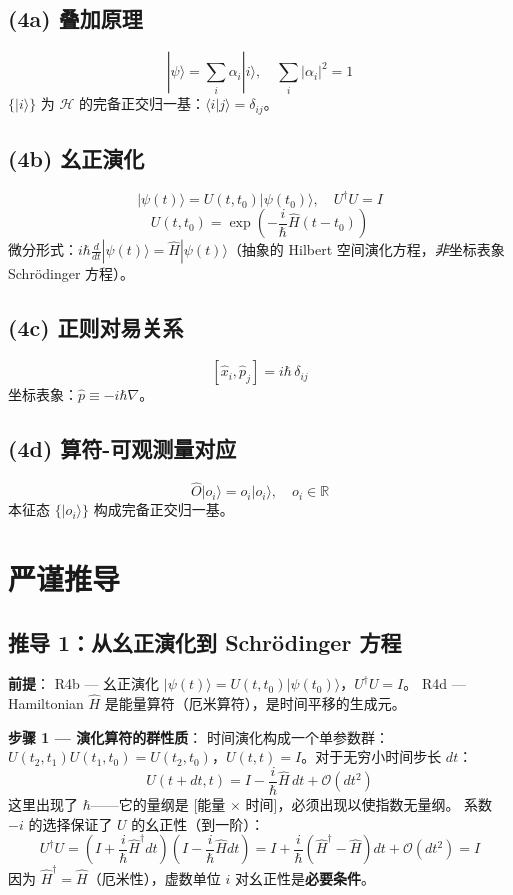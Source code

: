 \subsection{(4a) 叠加原理}
\[
|\psi\rangle = \sum_{i} \alpha_i |i\rangle, \quad \sum_i |\alpha_i|^2 = 1
\]
$\{|i\rangle\}$ 为 $\mathcal{H}$ 的完备正交归一基：$\langle i|j\rangle = \delta_{ij}$。

\subsection{(4b) 幺正演化}
\[
|\psi(t)\rangle = U(t, t_0) |\psi(t_0)\rangle, \quad U^\dagger U = I
\]
\[
U(t, t_0) = \exp\!\left(-\frac{i}{\hbar} \hat{H} (t - t_0)\right)
\]
微分形式：$i\hbar \frac{d}{dt}|\psi(t)\rangle = \hat{H} |\psi(t)\rangle$（抽象的 Hilbert 空间演化方程，\textit{非}坐标表象 Schrödinger 方程）。

\subsection{(4c) 正则对易关系}
\[
[\hat{x}_i, \hat{p}_j] = i\hbar\,\delta_{ij}
\]
坐标表象：$\hat{p} \equiv -i\hbar\nabla$。

\subsection{(4d) 算符-可观测量对应}
\[
\hat{O}|o_i\rangle = o_i|o_i\rangle, \quad o_i \in \mathbb{R}
\]
本征态 $\{|o_i\rangle\}$ 构成完备正交归一基。

\section{严谨推导}

\subsection{推导 1：从幺正演化到 Schrödinger 方程}

\textbf{前提}：\fbox{[N]} R4b — 幺正演化 $|\psi(t)\rangle = U(t,t_0)|\psi(t_0)\rangle$，$U^\dagger U = I$。\fbox{[N]} R4d — Hamiltonian $\hat{H}$ 是能量算符（厄米算符），是时间平移的生成元。

\textbf{步骤 1 — 演化算符的群性质}：\fbox{[S]} 时间演化构成一个单参数群：$U(t_2, t_1)U(t_1, t_0) = U(t_2, t_0)$，$U(t, t) = I$。对于无穷小时间步长 $dt$：
\begin{equation}
U(t+dt, t) = I - \frac{i}{\hbar}\hat{H}\,dt + \mathcal{O}(dt^2)
\end{equation}
\fbox{[N]} 这里出现了 $\hbar$——它的量纲是 [能量 $\times$ 时间]，必须出现以使指数无量纲。\fbox{[S]} 系数 $-i$ 的选择保证了 $U$ 的幺正性（到一阶）：
\begin{equation}
U^\dagger U = (I + \frac{i}{\hbar}\hat{H}^\dagger dt)(I - \frac{i}{\hbar}\hat{H} dt) = I + \frac{i}{\hbar}(\hat{H}^\dagger - \hat{H})dt + \mathcal{O}(dt^2) = I
\end{equation}
因为 $\hat{H}^\dagger = \hat{H}$（厄米性），虚数单位 $i$ 对幺正性是\textbf{必要条件}。


